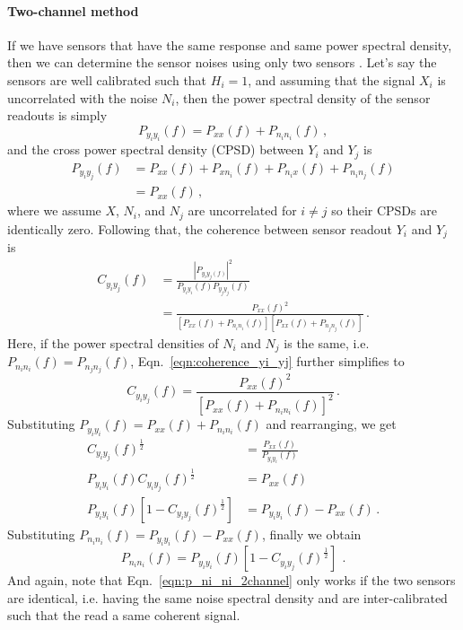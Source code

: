 \paragraph{Two-channel method}

If we have sensors that have the same response and same power spectral density, then we can determine the sensor noises using only two sensors \cite{technique_for_measurement_of_the_noise}.
Let's say the sensors are well calibrated such that $H_i=1$, and assuming that the signal $X_i$ is uncorrelated with the noise $N_i$, then the power spectral density of the sensor readouts is simply
\begin{equation}
	P_{y_iy_i}(f) = P_{xx}(f) + P_{n_i n_i}(f)\,,
\end{equation}
and the cross power spectral density (CPSD) between $Y_i$ and $Y_j$ is
\begin{equation}
	\begin{split}
	P_{y_iy_j}(f) &= P_{xx}(f) + P_{xn_i}(f) + P_{n_ix}(f) + P_{n_in_j}(f) \\
	&= P_{xx}(f)\,,
	\end{split}
\end{equation}
where we assume $X$, $N_i$, and $N_j$ are uncorrelated for $i\neq j$ so their CPSDs are identically zero.
Following that, the coherence between sensor readout $Y_i$ and $Y_j$ is
\begin{equation}
	\begin{split}
	C_{y_iy_j}(f) &= \frac{\left\lvert P_{y_iy_j(f)}\right\rvert^2}{P_{y_iy_i}(f)P_{y_jy_j}(f)}\\
	&= \frac{P_{xx}(f)^2}{\left[P_{xx}(f)+P_{n_i n_i}(f)\right]\left[P_{xx}(f)+P_{n_j n_j}(f)\right]} \,.
	\end{split}
	\label{eqn:coherence_yi_yj}
\end{equation}
Here, if the power spectral densities of $N_i$ and $N_j$ is the same, i.e. $P_{n_in_i}(f)=P_{n_jn_j}(f)$, Eqn.~\eqref{eqn:coherence_yi_yj} further simplifies to
\begin{equation}
	C_{y_iy_j}(f) = \frac{P_{xx}(f)^2}{\left[P_{xx}(f)+P_{n_i n_i}(f)\right]^2}\,.
\end{equation}
Substituting $P_{y_i y_i}(f) = P_{xx}(f) + P_{n_i n_i}(f)$ and rearranging, we get
\begin{equation}
	\begin{split}
		C_{y_iy_j}(f)^\frac{1}{2} &= \frac{P_{xx}(f)}{P_{y_iy_i}(f)} \\
		P_{y_iy_i}(f)C_{y_iy_j}(f)^\frac{1}{2} &= P_{xx}(f) \\
		P_{y_iy_i}(f)\left[1-C_{y_iy_j}(f)^\frac{1}{2}\right] &= P_{y_iy_i}(f) - P_{xx}(f)\,.
	\end{split}
\end{equation}
Substituting $P_{n_i n_i}(f) = P_{y_i y_i}(f) - P_{xx}(f)$, finally we obtain
\begin{equation}
	\boxed{
		P_{n_i n_i}(f) = P_{y_iy_i}(f)\left[1-C_{y_iy_j}(f)^\frac{1}{2}\right]
	}\,\ .
	\label{eqn:p_ni_ni_2channel}
\end{equation}
And again, note that Eqn.~\eqref{eqn:p_ni_ni_2channel} only works if the two sensors are identical, i.e. having the same noise spectral density and are inter-calibrated such that the read a same coherent signal.


